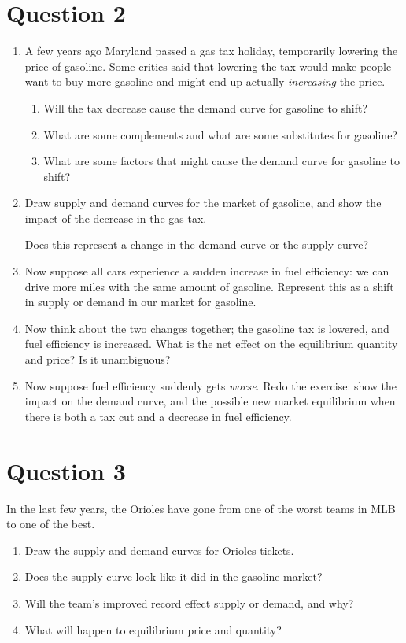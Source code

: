 \documentclass[12pt]{article}
\begin{document}
\section*{Question 2}
\begin{enumerate}

\item A few years ago Maryland passed a gas tax holiday, temporarily lowering the price of gasoline. Some critics said that lowering the tax would make people want to buy more gasoline and might end up actually \textit{increasing} the price.

\begin{enumerate}
    \item Will the tax decrease cause the demand curve for gasoline to shift?
    \item What are some complements and what are some substitutes for gasoline?
    \item What are some factors that might cause the demand curve for gasoline to shift?
\end{enumerate}


\item Draw supply and demand curves for the market of gasoline, and show the impact of the decrease in the gas tax.

\medskip

Does this represent a change in the demand curve or the supply curve?


\item Now suppose all cars experience a sudden increase in fuel efficiency: we can drive more miles with the same amount of gasoline. Represent this as a shift in supply or demand in our market for gasoline.


\item Now think about the two changes together; the gasoline tax is lowered, and fuel efficiency is increased. What is the net effect on the equilibrium quantity and price? Is it unambiguous?


\item Now suppose fuel efficiency suddenly gets \textit{worse}. Redo the exercise: show the impact on the demand curve, and the possible new market equilibrium when there is both a tax cut and a decrease in fuel efficiency.

\end{enumerate}

\section*{Question 3}
In the last few years, the Orioles have gone from one of the worst teams in MLB to one of the best.

\begin{enumerate}
    \item Draw the supply and demand curves for Orioles tickets.
    \item Does the supply curve look like it did in the gasoline market?
    \item Will the team's improved record effect supply or demand, and why?
    \item What will happen to equilibrium price and quantity?
\end{enumerate}
\end{document}
